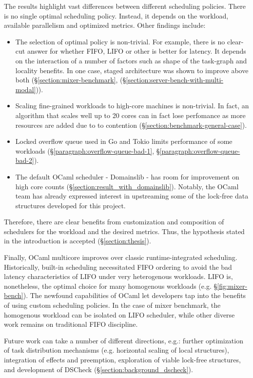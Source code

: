 \documentclass[12pt,a4paper,twoside]{report}
\begin{document}
The results highlight vast differences between different scheduling policies. There is no single optimal scheduling policy. Instead, it depends on the workload, available parallelism and optimized metrics. Other findings include: 
\begin{itemize}
    \item The selection of optimal policy is non-trivial. For example, there is no clear-cut answer for whether FIFO, LIFO or other is better for latency. It depends on the interaction of a number of factors such as shape of the task-graph and locality benefits. In one case, staged architecture was shown to improve above both (\S\ref{section:mixer-benchmark}, (\S\ref{section:server-bench-with-multi-modal})). 
    \item Scaling fine-grained workloads to high-core machines is non-trivial. In fact, an algorithm that scales well up to 20 cores can in fact lose perfomance as more resources are added due to to contention (\S\ref{section:benchmark-general-case}).
    \item Locked overflow queue used in Go and Tokio limits performance of some workloads (\S\ref{paragraph:overflow-queue-bad-1}, \S\ref{paragraph:overflow-queue-bad-2}).
    \item The default OCaml scheduler - Domainslib \cite{ocamlmul59:online} - has room for improvement on high core counts (\S\ref{section:result_with_domainslib}). Notably, the OCaml team has already expressed interest in upstreaming some of the lock-free data structures developed for this project.
\end{itemize}
Therefore, there are clear benefits from customization and composition of schedulers for the workload and the desired metrics. Thus, the hypothesis stated in the introduction is accepted (\S\ref{section:thesis}). 

Finally, OCaml multicore improves over classic runtime-integrated scheduling. Historically, built-in scheduling necessitated FIFO ordering to avoid the bad latency characteristics of LIFO under very heterogenous workloads. LIFO is, nonetheless, the optimal choice for many homogenous workloads (e.g. \S\ref{fig:mixer-bench}). The newfound capabilities of OCaml let developers tap into the benefits of using custom scheduling policies. In the case of mixer benchmark, the homogenous workload can be isolated on LIFO scheduler, while other diverse work remains on traditional FIFO discipline.

Future work can take a number of different directions, e.g.: further optimization of task distribution mechanisms (e.g. horizontal scaling of local structures), integration of effects and preemption, exploration of viable lock-free structures, and development of DSCheck (\S\ref{section:background_dscheck}). 
\end{document}
